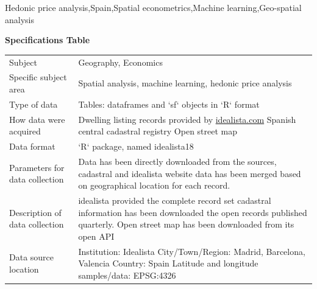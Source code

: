 \documentclass[times,final]{elsarticle}
\newcommand{\pkg}[1]{{\normalfont\fontseries{b}\selectfont #1}} \let\proglang=\textsf \let\code=\texttt
\begin{document}
\begin{frontmatter}
\begin{keyword}
\KWD Hedonic price analysis\sep Spain\sep Spatial econometrics\sep Machine learning\sep Geo-spatial analysis
\end{keyword}

\end{frontmatter}




{\fontsize{7.5pt}{9pt}


\textbf{Specifications Table}

\begin{longtable}{|p{33mm}|p{94mm}|}
\hline
\endhead
\hline
\endfoot
Subject                & Geography, Economics\\
Specific subject area  & Spatial analysis, machine learning, hedonic price analysis\\
Type of data           & Tables: dataframes and `sf` objects in `R` format\\
How data were acquired & Dwelling listing records provided by \url{idealista.com} \cite{idealista}\newline
                         Spanish central cadastral registry \cite{Catastro}\newline
                         Open street map \cite{OpenStreetMap}\\
\hline
Data format            & `R` package, named \pkg{idealista18}\\
\hline
Parameters for
data\newline
collection             & Data has been directly downloaded from the sources, cadastral and idealista website data has been merged based on geographical location for each record.
\\

\hline
Description of
data\newline
collection             & idealista provided the complete record set \newline
                         cadastral information has been downloaded the open records published quarterly. Open street map has been downloaded from its open API
\\
\hline
Data source location   & Institution: Idealista\newline
                         City/Town/Region: Madrid, Barcelona, Valencia\newline
                         Country: Spain\newline
                         Latitude and longitude samples/data: EPSG:4326\\


\end{longtable}}
\end{document}
